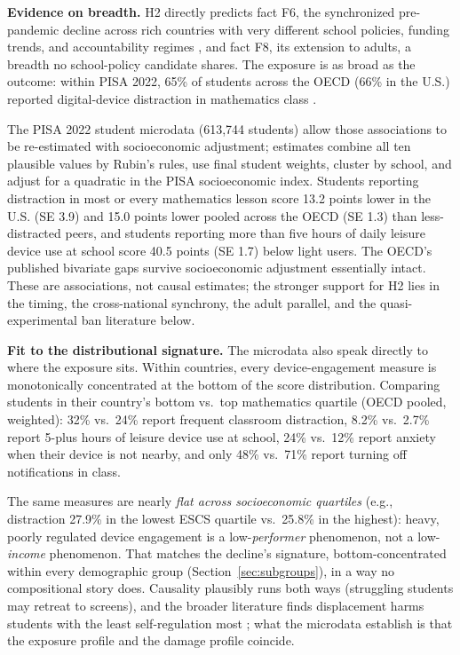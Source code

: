 \documentclass[11pt]{article}
\begin{document}
\textbf{Evidence on breadth.} H2 directly predicts fact F6, the synchronized pre-pandemic decline across rich countries with very different school policies, funding trends, and accountability regimes \citep{oecd2023}, and fact F8, its extension to adults, a breadth no school-policy candidate shares. The exposure is as broad as the outcome: within PISA 2022, 65\% of students across the OECD (66\% in the U.S.) reported digital-device distraction in mathematics class \citep{oecd2024}.

The PISA 2022 student microdata (613{,}744 students) allow those associations to be re-estimated with socioeconomic adjustment; estimates combine all ten plausible values by Rubin's rules, use final student weights, cluster by school, and adjust for a quadratic in the PISA socioeconomic index. Students reporting distraction in most or every mathematics lesson score 13.2 points lower in the U.S. (SE 3.9) and 15.0 points lower pooled across the OECD (SE 1.3) than less-distracted peers, and students reporting more than five hours of daily leisure device use at school score 40.5 points (SE 1.7) below light users. The OECD's published bivariate gaps survive socioeconomic adjustment essentially intact. These are associations, not causal estimates; the stronger support for H2 lies in the timing, the cross-national synchrony, the adult parallel, and the quasi-experimental ban literature below.

\textbf{Fit to the distributional signature.} The microdata also speak directly to where the exposure sits. Within countries, every device-engagement measure is monotonically concentrated at the bottom of the score distribution. Comparing students in their country's bottom vs.\ top mathematics quartile (OECD pooled, weighted): 32\% vs.\ 24\% report frequent classroom distraction, 8.2\% vs.\ 2.7\% report 5-plus hours of leisure device use at school, 24\% vs.\ 12\% report anxiety when their device is not nearby, and only 48\% vs.\ 71\% report turning off notifications in class.

The same measures are nearly \emph{flat across socioeconomic quartiles} (e.g., distraction 27.9\% in the lowest ESCS quartile vs.\ 25.8\% in the highest): heavy, poorly regulated device engagement is a low-\emph{performer} phenomenon, not a low-\emph{income} phenomenon. That matches the decline's signature, bottom-concentrated within every demographic group (Section~\ref{sec:subgroups}), in a way no compositional story does. Causality plausibly runs both ways (struggling students may retreat to screens), and the broader literature finds displacement harms students with the least self-regulation most \citep{haidt2024}; what the microdata establish is that the exposure profile and the damage profile coincide.
\end{document}
